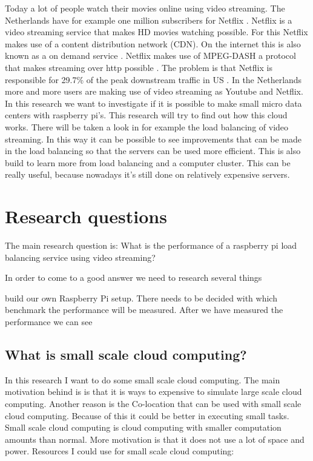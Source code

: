 \documentclass{sig-alternate-br}
\begin{document}
Today a lot of people watch their movies online using video streaming. 
The Netherlands have for example one million subscribers for Netflix \cite{volkskrant}. Netflix is a video streaming service that makes HD movies watching possible. For this Netflix makes use of a content distribution network (CDN). On the internet
this is also known as a on demand service \cite{Adhikari:2012}. Netflix makes use of
MPEG-DASH a protocol that makes streaming over http possible \cite{martin:2013}. The problem is that Netflix is responsible for  29.7\% of the peak downstream traffic in US  \cite{Adhikari:2012}. In the Netherlands more and more users are making use of video streaming as Youtube and Netflix.  In this research we want to investigate if it is possible to make small micro data centers with raspberry pi's. This research will try to find out how this cloud works. There will be taken a look in for example the load balancing of video streaming. In this way it can be possible to see improvements that can be made in the load balancing so that the servers can be used more efficient. This is also build to learn more from load balancing and a computer cluster. This can be really useful, because nowadays it's still done on relatively expensive servers. 


\section{Research questions}
The main research question
is: What is the performance of a raspberry pi load balancing service using video streaming?

In order to come to a good answer we need to  research several things

build our own Raspberry Pi setup. There needs to be decided with which benchmark the performance will be measured. After we have measured the performance we can see   


\subsection{What is small scale cloud computing?}
In this research I want to do some small scale cloud computing. The main motivation behind is is that it is ways to expensive to simulate large scale cloud computing. Another reason is the Co-location that can be used with small scale cloud computing. Because of this it could be better in executing small tasks. Small scale cloud computing is cloud computing with smaller computation amounts than normal. More motivation is that it does not use a lot of space and power. 
Resources I could use for small scale cloud computing:
\cite{Pcextreme,armbrust:2009,richardson:2012,abrahamsson:2013,southampton}
 
\end{document}
